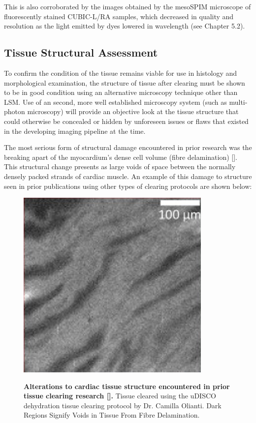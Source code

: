 This is also corroborated by the images obtained by the mesoSPIM microscope of fluorescently stained CUBIC-L/RA samples, which decreased in quality and resolution as the light emitted by dyes lowered in wavelength (see Chapter 5.2). 

\subsection{Tissue Structural Assessment}

To confirm the condition of the tissue remains viable for use in histology and morphological examination, the structure of tissue after clearing must be shown to be in good condition using an alternative microscopy technique other than LSM. Use of an second, more well established microscopy system (such as multi-photon microscopy) will provide an objective look at the tissue structure that could otherwise be concealed or hidden by unforeseen issues or flaws that existed in the developing imaging pipeline at the time.

The most serious form of structural damage encountered in prior research was the breaking apart of the myocardium's dense cell volume (fibre delamination) []. This structural change presents as large voids of space between the normally densely packed strands of cardiac muscle. An example of this damage to structure seen in prior publications using other types of clearing protocols are shown below:

\begin{figure}[H]
\centering
\includegraphics[width=0.5\linewidth]{Images/Camilla Picture.jpg}
\label{fig:enter-label}
\caption{\textbf{Alterations to cardiac tissue structure encountered in prior tissue clearing research [].} Tissue cleared using the uDISCO dehydration tissue clearing protocol by Dr. Camilla Olianti. Dark Regions Signify Voids in Tissue From Fibre Delamination.}
\end{figure}


